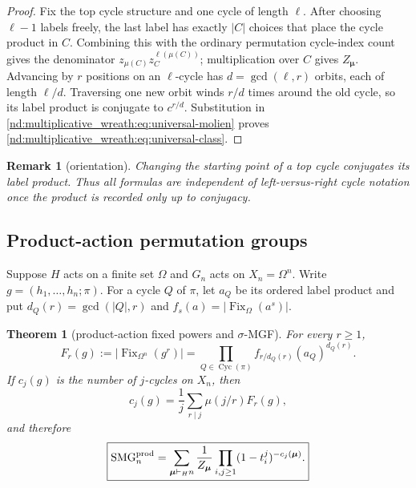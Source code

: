 \documentclass[10pt]{article}
\newcommand{\Fix}{\operatorname{Fix}}
\newcommand{\SMG}{\operatorname{SMG}}
\newcommand{\MGF}{\SMG}
\newcommand{\Cyc}{\operatorname{Cyc}}
\newtheorem{theorem}{Theorem}
\newtheorem{remark}{Remark}
\begin{document}
\begin{proof}
Fix the top cycle structure and one cycle of length $\ell$.  After choosing
$\ell-1$ labels freely, the last label has exactly $|C|$ choices that place
the cycle product in $C$.  Combining this with the ordinary permutation
cycle-index count gives the denominator $z_{\mu(C)}z_C^{\ell(\mu(C))}$;
multiplication over $C$ gives $Z_{\boldsymbol\mu}$.  Advancing by $r$ positions
on an $\ell$-cycle has $d=\gcd(\ell,r)$ orbits, each of length $\ell/d$.
Traversing one new orbit winds $r/d$ times around the old cycle, so its label
product is conjugate to $c^{r/d}$.  Substitution in
\eqref{nd:multiplicative_wreath:eq:universal-molien} proves \eqref{nd:multiplicative_wreath:eq:universal-class}.
\end{proof}

\begin{remark}[orientation]
Changing the starting point of a top cycle conjugates its label product.
Thus all formulas are independent of left-versus-right cycle notation once
the product is recorded only up to conjugacy.
\end{remark}

\subsection{Product-action permutation groups}

Suppose $H$ acts on a finite set $\Omega$ and $G_n$ acts on
$X_n=\Omega^n$.  Write $g=(h_1,\ldots,h_n;\pi)$.  For a cycle $Q$ of $\pi$,
let $a_Q$ be its ordered label product and put
$d_Q(r)=\gcd(|Q|,r)$ and $f_s(a)=|\Fix_\Omega(a^s)|$.

\begin{theorem}[product-action fixed powers and $\sigma$-MGF]
For every $r\ge1$,
\begin{equation}\label{nd:multiplicative_wreath:eq:product-fixed}
 \boxed{F_r(g):=|\Fix_{\Omega^n}(g^r)|
 =\prod_{Q\in\Cyc(\pi)}
 f_{r/d_Q(r)}(a_Q)^{d_Q(r)}.}
\end{equation}
If $c_j(g)$ is the number of $j$-cycles on $X_n$, then
\begin{equation}\label{nd:multiplicative_wreath:eq:mobius}
 c_j(g)=\frac1j\sum_{r\mid j}\mu(j/r)F_r(g),
\end{equation}
and therefore
\begin{equation}\label{nd:multiplicative_wreath:eq:product-smg}
 \boxed{\MGF^{\rm prod}_n
 =\sum_{\boldsymbol\mu\vdash_H n}\frac1{Z_{\boldsymbol\mu}}
 \prod_{i,j\ge1}(1-t_i^j)^{-c_j(\boldsymbol\mu)}.}
\end{equation}
\end{theorem}
\end{document}
